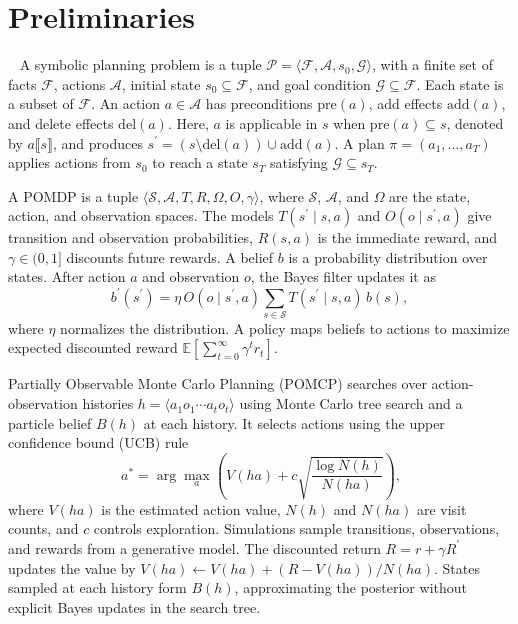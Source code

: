 \section{Preliminaries}~\label{preliminaries}
A symbolic planning problem is a tuple $\mathcal{P}=\langle\mathcal{F},\mathcal{A},s_0,\mathcal{G}\rangle$, with a finite set of facts $\mathcal{F}$, actions $\mathcal{A}$, initial state $s_0\subseteq\mathcal{F}$, and goal condition $\mathcal{G}\subseteq\mathcal{F}$. Each state is a subset of $\mathcal{F}$. An action $a\in\mathcal{A}$ has preconditions $\mathrm{pre}(a)$, add effects $\mathrm{add}(a)$, and delete effects $\mathrm{del}(a)$.
Here, $a$ is applicable in $s$ when $\mathrm{pre}(a)\subseteq s$, denoted by $a\llbracket s\rrbracket$, and produces $s^\prime=(s\setminus\mathrm{del}(a))\cup\mathrm{add}(a)$. A plan $\pi=(a_1,\ldots,a_T)$ applies actions from $s_0$ to reach a state $s_T$ satisfying $\mathcal{G}\subseteq s_T$.

A POMDP is a tuple $\langle\mathcal{S},\mathcal{A},T,R,\Omega,O,\gamma\rangle$, where $\mathcal{S}$, $\mathcal{A}$, and $\Omega$ are the state, action, and observation spaces. The models $T(s^\prime\mid s,a)$ and $O(o\mid s^\prime,a)$ give transition and observation probabilities, $R(s,a)$ is the immediate reward, and $\gamma\in(0,1]$ discounts future rewards. A belief $b$ is a probability distribution over states. After action $a$ and observation $o$, the Bayes filter updates it as
\[
b^\prime(s^\prime) = \eta \, O(o \mid s^\prime,a) \sum_{s \in \mathcal{S}} T(s^\prime \mid s,a) \, b(s),
\]
where $\eta$ normalizes the distribution. A policy maps beliefs to actions to maximize expected discounted reward $\mathbb{E}[\sum_{t=0}^{\infty}\gamma^t r_t]$.

Partially Observable Monte Carlo Planning (POMCP) searches over action-observation histories $h=\langle a_1o_1\cdots a_to_t\rangle$ using Monte Carlo tree search and a particle belief $B(h)$ at each history. It selects actions using the upper confidence bound (UCB) rule
\begin{equation}~\label{eq:ucb}
a^* = \arg\max_a \left( V(ha) + c \sqrt{\frac{\log N(h)}{N(ha)}} \right),
\end{equation}
where $V(ha)$ is the estimated action value, $N(h)$ and $N(ha)$ are visit counts, and $c$ controls exploration. Simulations sample transitions, observations, and rewards from a generative model. The discounted return $R=r+\gamma R^\prime$ updates the value by $V(ha)\leftarrow V(ha)+(R-V(ha))/N(ha)$. States sampled at each history form $B(h)$, approximating the posterior without explicit Bayes updates in the search tree.
